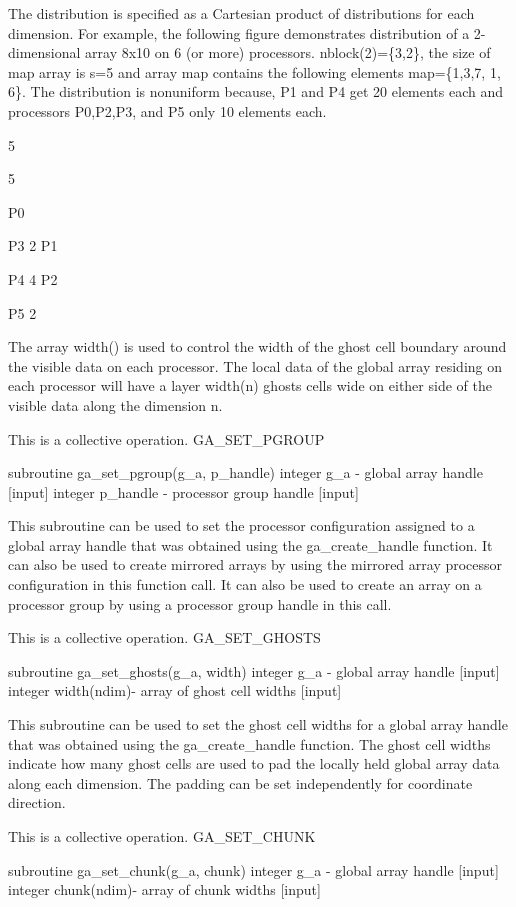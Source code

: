 The distribution is specified as a Cartesian product of distributions
for each dimension. For example, the following figure demonstrates
distribution of a 2-dimensional array 8x10 on 6 (or more) processors.
nblock(2)=\{3,2\}, the size of map array is s=5 and array map contains
the following elements map=\{1,3,7, 1, 6\}. The distribution is nonuniform
because, P1 and P4 get 20 elements each and processors P0,P2,P3, and
P5 only 10 elements each. 

5 

5 

P0 

P3 2 P1 

P4 4 P2 

P5 2

The array width() is used to control the width of the ghost cell boundary
around the visible data on each processor. The local data of the global
array residing on each processor will have a layer width(n) ghosts
cells wide on either side of the visible data along the dimension
n.

This is a collective operation. GA\_SET\_PGROUP

subroutine ga\_set\_pgroup(g\_a, p\_handle) integer g\_a - global
array handle {[}input{]} integer p\_handle - processor group handle
{[}input{]}

This subroutine can be used to set the processor configuration assigned
to a global array handle that was obtained using the ga\_create\_handle
function. It can also be used to create mirrored arrays by using the
mirrored array processor configuration in this function call. It can
also be used to create an array on a processor group by using a processor
group handle in this call.

This is a collective operation. GA\_SET\_GHOSTS

subroutine ga\_set\_ghosts(g\_a, width) integer g\_a - global array
handle {[}input{]} integer width(ndim)- array of ghost cell widths
{[}input{]}

This subroutine can be used to set the ghost cell widths for a global
array handle that was obtained using the ga\_create\_handle function.
The ghost cell widths indicate how many ghost cells are used to pad
the locally held global array data along each dimension. The padding
can be set independently for coordinate direction.

This is a collective operation. GA\_SET\_CHUNK

subroutine ga\_set\_chunk(g\_a, chunk) integer g\_a - global array
handle {[}input{]} integer chunk(ndim)- array of chunk widths {[}input{]}

